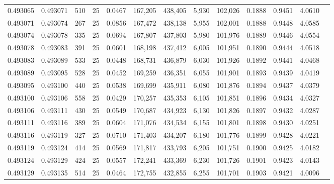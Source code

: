 \begin{tabular}{rrrrrrrrrrrrr}
0.493065 & 0.493071 &   510 &  25 &                                     0.0467 & 167,205 & 438,405 &   5,930 & 102,026 & 0.1888 & 0.9451 & 4.0610 \\
0.493071 & 0.493074 &   267 &  25 &                                     0.0856 & 167,472 & 438,138 &   5,955 & 102,001 & 0.1888 & 0.9448 & 4.0585 \\
0.493074 & 0.493078 &   335 &  25 &                                     0.0694 & 167,807 & 437,803 &   5,980 & 101,976 & 0.1889 & 0.9446 & 4.0554 \\
0.493078 & 0.493083 &   391 &  25 &                                     0.0601 & 168,198 & 437,412 &   6,005 & 101,951 & 0.1890 & 0.9444 & 4.0518 \\
0.493083 & 0.493089 &   533 &  25 &                                     0.0448 & 168,731 & 436,879 &   6,030 & 101,926 & 0.1892 & 0.9441 & 4.0468 \\
0.493089 & 0.493095 &   528 &  25 &                                     0.0452 & 169,259 & 436,351 &   6,055 & 101,901 & 0.1893 & 0.9439 & 4.0419 \\
0.493095 & 0.493100 &   440 &  25 &                                     0.0538 & 169,699 & 435,911 &   6,080 & 101,876 & 0.1894 & 0.9437 & 4.0379 \\
0.493100 & 0.493106 &   558 &  25 &                                     0.0429 & 170,257 & 435,353 &   6,105 & 101,851 & 0.1896 & 0.9434 & 4.0327 \\
0.493106 & 0.493111 &   430 &  25 &                                     0.0549 & 170,687 & 434,923 &   6,130 & 101,826 & 0.1897 & 0.9432 & 4.0287 \\
0.493111 & 0.493116 &   389 &  25 &                                     0.0604 & 171,076 & 434,534 &   6,155 & 101,801 & 0.1898 & 0.9430 & 4.0251 \\
0.493116 & 0.493119 &   327 &  25 &                                     0.0710 & 171,403 & 434,207 &   6,180 & 101,776 & 0.1899 & 0.9428 & 4.0221 \\
0.493119 & 0.493124 &   414 &  25 &                                     0.0569 & 171,817 & 433,793 &   6,205 & 101,751 & 0.1900 & 0.9425 & 4.0182 \\
0.493124 & 0.493129 &   424 &  25 &                                     0.0557 & 172,241 & 433,369 &   6,230 & 101,726 & 0.1901 & 0.9423 & 4.0143 \\
0.493129 & 0.493135 &   514 &  25 &                                     0.0464 & 172,755 & 432,855 &   6,255 & 101,701 & 0.1903 & 0.9421 & 4.0096 \\

\end{tabular}
